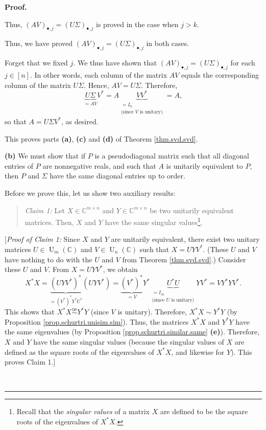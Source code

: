 \documentclass[numbers=enddot,12pt,final,onecolumn,notitlepage]{scrartcl}%
\numberwithin{exer}{subsection}
\theoremstyle{definition}
\newenvironment{statement}{\begin{quote}}{\end{quote}}
\newenvironment{proof}[1][Proof]{\noindent\textbf{#1.} }{\ \rule{0.5em}{0.5em}}
\begin{document}
\begin{proof}
\begin{itemize}
Thus, $\left(  AV\right)  _{\bullet,j}=\left(  U\Sigma\right)  _{\bullet,j}$
is proved in the case when $j>k$.
\end{itemize}

Thus, we have proved $\left(  AV\right)  _{\bullet,j}=\left(  U\Sigma\right)
_{\bullet,j}$ in both cases.

Forget that we fixed $j$. We thus have shown that $\left(  AV\right)
_{\bullet,j}=\left(  U\Sigma\right)  _{\bullet,j}$ for each $j\in\left[
n\right]  $. In other words, each column of the matrix $AV$ equals the
corresponding column of the matrix $U\Sigma$. Hence, $AV=U\Sigma$. Therefore,%
\[
\underbrace{U\Sigma}_{=AV}V^{\ast}=A\underbrace{VV^{\ast}}_{\substack{=I_{n}%
\\\text{(since }V\text{ is unitary)}}}=A,
\]
so that $A=U\Sigma V^{\ast}$, as desired.

This proves parts \textbf{(a)}, \textbf{(c)} and \textbf{(d)} of Theorem
\ref{thm.svd.svd}. \medskip

\textbf{(b)} We must show that if $P$ is a pseudodiagonal matrix such that all
diagonal entries of $P$ are nonnegative reals, and such that $A$ is unitarily
equivalent to $P$, then $P$ and $\Sigma$ have the same diagonal entries up to order.

Before we prove this, let us show two auxiliary results:

\begin{statement}
\textit{Claim 1:} Let $X\in\mathbb{C}^{m\times n}$ and $Y\in\mathbb{C}%
^{m\times n}$ be two unitarily equivalent matrices. Then, $X$ and $Y$ have the
same singular values\footnote{Recall that the \emph{singular values} of a
matrix $X$ are defined to be the square roots of the eigenvalues of $X^{\ast
}X$.}.
\end{statement}

[\textit{Proof of Claim 1:} Since $X$ and $Y$ are unitarily equivalent, there
exist two unitary matrices $U\in\operatorname*{U}\nolimits_{m}\left(
\mathbb{C}\right)  $ and $V\in\operatorname*{U}\nolimits_{n}\left(
\mathbb{C}\right)  $ such that $X=UYV^{\ast}$. (These $U$ and $V$ have nothing
to do with the $U$ and $V$ from Theorem \ref{thm.svd.svd}.) Consider these $U$
and $V$. From $X=UYV^{\ast}$, we obtain%
\[
X^{\ast}X=\underbrace{\left(  UYV^{\ast}\right)  ^{\ast}}_{=\left(  V^{\ast
}\right)  ^{\ast}Y^{\ast}U^{\ast}}\left(  UYV^{\ast}\right)
=\underbrace{\left(  V^{\ast}\right)  ^{\ast}}_{=V}Y^{\ast}\underbrace{U^{\ast
}U}_{\substack{=I_{m}\\\text{(since }U\text{ is unitary)}}}YV^{\ast}=VY^{\ast
}YV^{\ast}.
\]
This shows that $X^{\ast}X\overset{\operatorname*{us}}{\sim}Y^{\ast}Y$ (since
$V$ is unitary). Therefore, $X^{\ast}X\sim Y^{\ast}Y$ (by Proposition
\ref{prop.schurtri.unisim.sim}). Thus, the matrices $X^{\ast}X$ and $Y^{\ast
}Y$ have the same eigenvalues (by Proposition \ref{prop.schurtri.similar.same}
\textbf{(e)}). Therefore, $X$ and $Y$ have the same singular values (because
the singular values of $X$ are defined as the square roots of the eigenvalues
of $X^{\ast}X$, and likewise for $Y$). This proves Claim 1.] \medskip


\end{proof}
\end{document}
